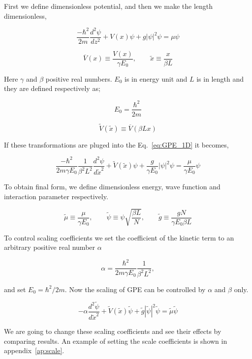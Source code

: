 \documentclass[a4paper,times,hidelinks,12pt]{article}
\begin{document}
First we define dimensionless potential, and then we make the length dimensionless,

\begin{equation}
    \label{eq:GPE_1D}
    \frac{-\hbar^2}{2m}\frac{d^2\psi}{dz^2} + V(x)\psi + g|\psi|^2\psi = \mu\psi
\end{equation}


$$ \overline{V}(x) \equiv \frac{V(x)}{\gamma E_0}, \qquad \widetilde{x} \equiv \frac{x}{\beta L} $$

Here $\gamma$ and $\beta$ positive real numbers. $E_0$ is in energy unit and $L$ is in length and they are defined respectively as;

$$E_0 = \frac{\hbar^2}{2m} $$


$$ \widetilde{V}(\widetilde{x}) \equiv \overline{V}(\beta L x) $$ 

If these transformations are pluged into the Eq.~\eqref{eq:GPE_1D} it becomes,

\begin{equation}
    \label{eq:GPE_1D_dimensionless_en_len}
    \frac{-\hbar^2}{2m\gamma E_0} \frac{1}{\beta^2 L^2}  \frac{d^2\psi}{d \widetilde{x}^2} + \widetilde{V}(\widetilde{x})\psi + \frac{g}{\gamma E_0}|\psi|^2\psi = \frac{\mu}{\gamma E_0}\psi
\end{equation}

To obtain final form, we define dimensionless energy, wave function and interaction parameter respectively. 

$$\widetilde{\mu} \equiv \frac{\mu}{\gamma E_0}, \qquad \widetilde{\psi} \equiv \psi{\sqrt{\frac{\beta L}{N}}}, \qquad \widetilde{g} \equiv \frac{gN}{\gamma E_0 \beta L} $$

To control scaling coefficients we set the coefficient of the kinetic term to an arbitrary positive real number $\alpha$  

$$ \alpha = \frac{\hbar^2}{2m\gamma E_0} \frac{1}{\beta^2 L^2} , $$

and set $E_0 = \hbar^2 / 2m$. Now the scaling of GPE can be controlled by $\alpha$ and $\beta$ only.

\begin{equation}
\label{eq:GPE_dimensionless}
    -\alpha\frac{d^2\widetilde{\psi}}{d\widetilde{x}^2} + \widetilde{V}(\widetilde{x})\widetilde{\psi} + \widetilde{g}|\widetilde{\psi}|^2 \widetilde{\psi} = \widetilde{\mu} \widetilde{\psi}
\end{equation}
    
We are going to change these scaling coefficients and see their effects by comparing results. An example of setting the scale coefficients is shown in appendix~\ref{ap:scale}.
\end{document}
